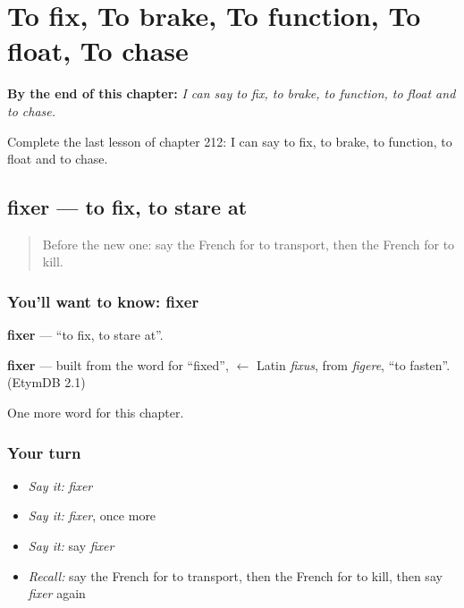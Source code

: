 
\chapter{To fix, To brake, To function, To float, To chase}
\label{ch:fr-to-fix-to-brake-to-function-to-float-to-chase}

\begin{chapteropening}
\textbf{By the end of this chapter:} \emph{I can say to fix, to brake, to function, to float and to chase.}

Complete the last lesson of chapter 212: I can say to fix, to brake, to function, to float and to chase.
\end{chapteropening}

\section[fixer]{fixer — to fix, to stare at}

\label{lesson:FR-C212-fixer}



\begin{quote}
Before the new one: say the French for to transport, then the French for to kill.
\end{quote}

\subsection*{You'll want to know: fixer}
\textbf{fixer} — \textquotedblleft{}to fix, to stare at\textquotedblright{}.

\begin{cousinweb}
\textbf{fixer} — built from the word for \textquotedblleft{}fixed\textquotedblright{}, $\leftarrow$ Latin \emph{fixus}, from \emph{figere}, \textquotedblleft{}to fasten\textquotedblright{}. (EtymDB 2.1)
\end{cousinweb}

\begin{grammarlens}[title={What you've built}]
One more word for this chapter.
\end{grammarlens}

\subsection*{Your turn}
\begin{itemize}
\raggedright
  \item \emph{Say it:} \emph{fixer}
  \item \emph{Say it:} \emph{fixer}, once more
  \item \emph{Say it:} say \emph{fixer}
  \item \emph{Recall:} say the French for to transport, then the French for to kill, then say \emph{fixer} again
\end{itemize}

